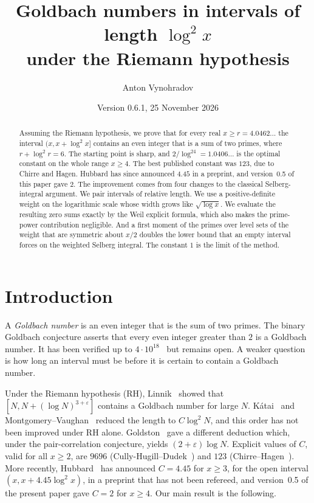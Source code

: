 \documentclass[11pt]{amsart}
\title[Goldbach numbers in short intervals]{Goldbach numbers in intervals of length $\log^2 x$\\ under the Riemann hypothesis}
\author{Anton Vynohradov}
\date{Version 0.6.1, 25 November 2026}
\theoremstyle{remark}
\begin{document}
\begin{abstract}
Assuming the Riemann hypothesis, we prove that for every real $x\ge r=4.0462\ldots$ the interval $(x,x+\log^2x]$ contains an even integer that is a sum of two primes, where $r+\log^2r=6$. The starting point is sharp, and $2/\log^24=1.0406\ldots$ is the optimal constant on the whole range $x\ge4$. The best published constant was $123$, due to Chirre and Hagen. Hubbard has since announced $4.45$ in a preprint, and version~0.5 of this paper gave $2$. The improvement comes from four changes to the classical Selberg-integral argument. We pair intervals of relative length. We use a positive-definite weight on the logarithmic scale whose width grows like $\sqrt{\log x}$. We evaluate the resulting zero sums exactly by the Weil explicit formula, which also makes the prime-power contribution negligible. And a first moment of the primes over level sets of the weight that are symmetric about $x/2$ doubles the lower bound that an empty interval forces on the weighted Selberg integral. The constant $1$ is the limit of the method.
\end{abstract}
\maketitle

\section{Introduction}

A \emph{Goldbach number} is an even integer that is the sum of two primes. The binary Goldbach conjecture asserts that every even integer greater than $2$ is a Goldbach number. It has been verified up to $4\cdot10^{18}$~\cite{OHP} but remains open. A weaker question is how long an interval must be before it is certain to contain a Goldbach number.

Under the Riemann hypothesis (RH), Linnik~\cite{Linnik} showed that $[N,N+(\log N)^{3+\varepsilon}]$ contains a Goldbach number for large $N$. Kátai~\cite{Katai} and Montgomery--Vaughan~\cite{MV} reduced the length to $C\log^2N$, and this order has not been improved under RH alone. Goldston~\cite{Goldston} gave a different deduction which, under the pair-correlation conjecture, yields $(2+\varepsilon)\log N$. Explicit values of $C$, valid for all $x\ge2$, are $9696$ (Cully-Hugill--Dudek~\cite{CHD}) and $123$ (Chirre--Hagen~\cite{CH}). More recently, Hubbard~\cite{Hubbard} has announced $C=4.45$ for $x\ge3$, for the open interval $(x,x+4.45\log^2x)$, in a preprint that has not been refereed, and version~0.5 of the present paper gave $C=2$ for $x\ge4$. Our main result is the following.
\end{document}
